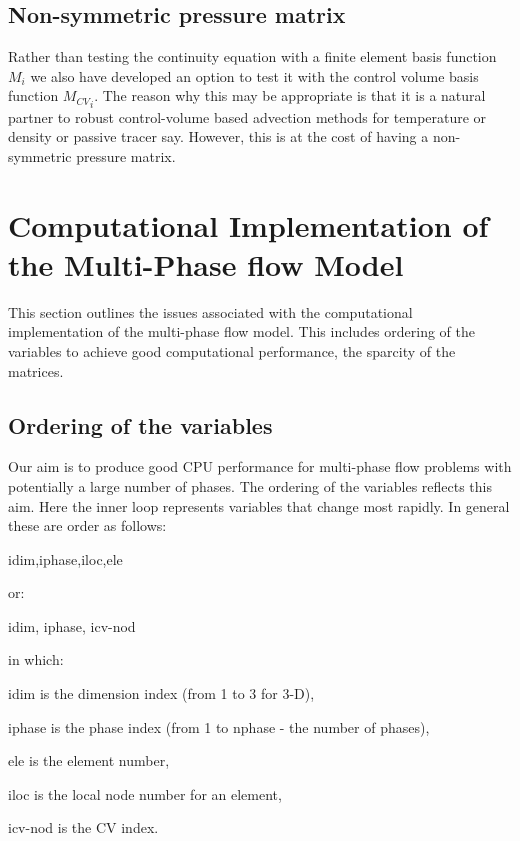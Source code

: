 \subsection{Non-symmetric pressure matrix}
Rather than testing the continuity equation with a finite element basis
function $M_i$ we also have developed an option to test it with the
control volume basis function ${M_{CV}}_i$. The reason why this may be appropriate
is that it is a natural partner to robust control-volume based
advection methods for temperature or density or passive tracer say.
However, this is at the cost of having a non-symmetric pressure matrix.




\pagebreak



\section{Computational Implementation of the Multi-Phase flow Model}
\label{Computational Implementation}

This section outlines the issues associated with the
computational implementation of the multi-phase flow model.
This includes ordering of the variables to achieve good computational
performance, the sparcity of the matrices.

\subsection{Ordering of the variables}
\label{Ordering}
Our aim is to produce good CPU performance for multi-phase flow
problems with potentially a large number of phases. The ordering of
the variables reflects this aim. Here the inner loop represents variables that
change most rapidly.
In general these are order as follows:

\par\noindent
idim,iphase,iloc,ele

\par\noindent
or:


\par\noindent
idim, iphase, icv-nod

\par\noindent
in which:
\par\noindent
 idim is the dimension index (from 1 to 3 for 3-D),
\par\noindent
iphase is the phase index (from 1 to nphase - the number of phases),
\par\noindent
ele is the element number,
\par\noindent
iloc is the local node number for an element,
\par\noindent
icv-nod is the CV index.

